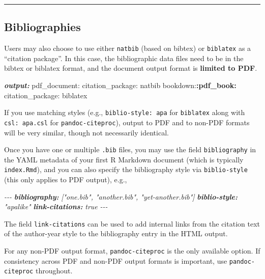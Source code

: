 \documentclass[
  a4paper,
  twoside,
  openright]{book}
\newenvironment{Shaded}{\begin{snugshade}}{\end{snugshade}}
\newcommand{\AnnotationTok}[1]{\textcolor[rgb]{0.56,0.35,0.01}{\textbf{\textit{#1}}}}
\newcommand{\CommentTok}[1]{\textcolor[rgb]{0.56,0.35,0.01}{\textit{#1}}}
\newcommand{\NormalTok}[1]{#1}
\newcommand{\SpecialCharTok}[1]{\textcolor[rgb]{0.81,0.36,0.00}{\textbf{#1}}}
\theoremstyle{definition}
\theoremstyle{definition}
\theoremstyle{definition}
\theoremstyle{definition}
\theoremstyle{remark}
\begin{document}
\begin{center}\rule{0.5\linewidth}{0.5pt}\end{center}

\subsection{Bibliographies}\label{bibliographies}

Users may also choose to use either \texttt{natbib} (based on bibtex) or \texttt{biblatex} as a ``citation package''.
In this case, the bibliographic data files need to be in the bibtex or biblatex format, and the document output format is \textbf{limited to PDF}.

\begin{Shaded}
\begin{Highlighting}[]
\AnnotationTok{output:}
\NormalTok{  pdf\_document:}
\NormalTok{    citation\_package: natbib}
\NormalTok{  bookdown:}\SpecialCharTok{:pdf\_book:}
\NormalTok{    citation\_package: biblatex}
\end{Highlighting}
\end{Shaded}

If you use matching styles (e.g., \texttt{biblio-style:\ apa} for \texttt{biblatex} along with \texttt{csl:\ apa.csl} for \texttt{pandoc-citeproc}), output to PDF and to non-PDF formats will be very similar, though not necessarily identical.

Once you have one or multiple \texttt{.bib} files, you may use the field \texttt{bibliography} in the YAML metadata of your first R Markdown document (which is typically \texttt{index.Rmd}), and you can also specify the bibliography style via \texttt{biblio-style} (this only applies to PDF output), e.g.,

\begin{Shaded}
\begin{Highlighting}[]
\CommentTok{{-}{-}{-}}
\AnnotationTok{bibliography:}\CommentTok{ ["one.bib", "another.bib", "yet{-}another.bib"]}
\AnnotationTok{biblio{-}style:}\CommentTok{ "apalike"}
\AnnotationTok{link{-}citations:}\CommentTok{ true}
\CommentTok{{-}{-}{-}}
\end{Highlighting}
\end{Shaded}

The field \texttt{link-citations} can be used to add internal links from the citation text of the author-year style to the bibliography entry in the HTML output.

For any non-PDF output format, \texttt{pandoc-citeproc} is the only available option. If consistency across PDF and non-PDF output formats is important, use \texttt{pandoc-citeproc} throughout.
\end{document}

